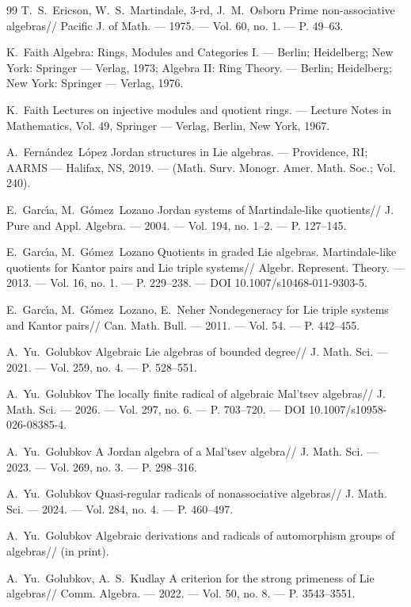 \documentclass[a4paper,11pt]{article}
\begin{document}
\begin{thebibliography}{99}
 T.~S.~Ericson, W.~S.~Martindale, 3-rd, J.~M.~Osborn 
Prime non-associative algebras// Pacific J. of Math. --- 1975. --- 
Vol. 60, no. 1. --- P. 49--63.

 K.~Faith Algebra: Rings, Modules and Categories I. --- 
Berlin; Heidelberg; New York: Springer --- Verlag, 1973; Algebra II: 
Ring Theory. --- Berlin; Heidelberg; New York: Springer --- Verlag, 1976.

 K.~Faith Lectures on injective modules and quotient rings. --- 
Lecture Notes in Mathematics, Vol. 49, Springer --- Verlag, Berlin, 
New York, 1967.

 A.~Fern{\'a}ndez~L{\'o}pez Jordan structures in Lie algebras. 
--- Providence, RI; AARMS --- Halifax, NS, 2019. --- 
(Math. Surv. Monogr. Amer. Math. Soc.; Vol. 240).
                                    
 E.~Garc{\'\i}a, M.~G{\'o}mez~Lozano Jordan systems of 
Martindale-like quotients// J. Pure and Appl. Algebra. --- 2004. --- Vol. 194, 
no. 1--2. --- P. 127--145. 

 E.~Garc{\'\i}a, M.~G{\'o}mez~Lozano Quotients in graded Lie 
algebras. Martindale-like quotients for Kantor pairs and Lie triple systems// 
Algebr. Represent. Theory. --- 2013. --- Vol. 16, no. 1. --- P. 229--238. ---
DOI 10.1007/s10468-011-9303-5.

 E.~Garc{\'\i}a, M.~G{\'o}mez~Lozano, E.~Neher Nondegeneracy 
for Lie triple systems and Kantor pairs// Can. Math. Bull. --- 2011. --- 
Vol. 54. --- P. 442--455.

 A.~Yu.~Golubkov Algebraic Lie algebras of bounded degree// 
J. Math. Sci. --- 2021. --- Vol. 259, no. 4. --- P. 528--551.

 A.~Yu.~Golubkov The locally finite radical of algebraic Mal'tsev 
algebras// J. Math. Sci. --- 2026. --- Vol. 297, no. 6. --- P. 703--720. ---
DOI 10.1007/s10958-026-08385-4.

 A.~Yu.~Golubkov A Jordan algebra of a Mal'tsev algebra// 
J. Math. Sci. --- 2023. --- Vol. 269, no. 3. --- P. 298--316. 

 A.~Yu.~Golubkov Quasi-regular radicals of nonassociative 
algebras// J. Math. Sci. --- 2024. --- Vol. 284, no. 4. --- P. 460--497.

 A.~Yu.~Golubkov Algebraic derivations and radicals of 
automorphism groups of algebras// (in print).

 A.~Yu.~Golubkov, A.~S.~Kudlay A criterion for the strong primeness 
of Lie algebras// Comm. Algebra. --- 2022. --- Vol. 50, no. 8. --- P. 3543--3551.


\end{thebibliography}
\end{document}
